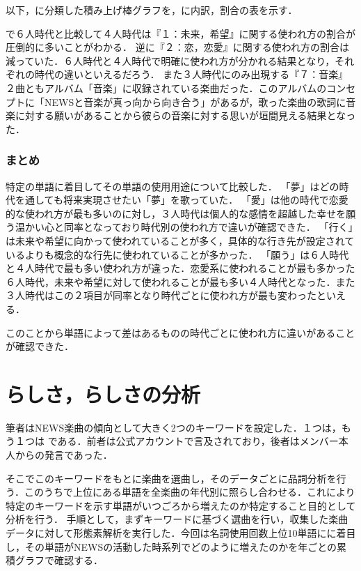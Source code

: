 以下，に分類した積み上げ棒グラフを，\protect{}に内訳，割合の表を示す．

\protect{}で６人時代と比較して４人時代は『１：未来，希望』に関する使われ方の割合が圧倒的に多いことがわかる．
逆に『２：恋，恋愛』に関する使われ方の割合は減っていた．６人時代と４人時代で明確に使われ方が分かれる結果となり，それぞれの時代の違いといえるだろう．
また３人時代にのみ出現する『７：音楽』２曲ともアルバム「音楽\cite{Ongaku}」に収録されている楽曲だった．このアルバムのコンセプトに「NEWSと音楽が真っ向から向き合う」があるが，歌った楽曲の歌詞に音楽に対する願いがあることから彼らの音楽に対する思いが垣間見える結果となった．


\subsubsection{まとめ}
特定の単語に着目してその単語の使用用途について比較した．
「夢」はどの時代を通しても将来実現させたい「夢」を歌っていた．
「愛」は他の時代で恋愛的な使われ方が最も多いのに対し，３人時代は個人的な感情を超越した幸せを願う温かい心と同率となっており時代別の使われ方で違いが確認できた．
「行く」は未来や希望に向かって使われていることが多く，具体的な行き先が設定されているよりも概念的な行先に使われていることが多かった．
「願う」は６人時代と４人時代で最も多い使われ方が違った．恋愛系に使われることが最も多かった６人時代，未来や希望に対して使われることが最も多い４人時代となった．また３人時代はこの２項目が同率となり時代ごとに使われ方が最も変わったといえる．

このことから単語によって差はあるものの時代ごとに使われ方に違いがあることが確認できた．



\section{\senaka らしさ，\emotional らしさの分析}\label{sec:words}

筆者はNEWS楽曲の傾向として大きく2つのキーワードを設定した．１つは\senaka ，もう１つは \emotional である．前者は公式アカウントで言及されており，後者はメンバー本人からの発言であった．

そこでこのキーワードをもとに楽曲を選曲し，そのデータごとに品詞分析を行う．このうちで上位にある単語を全楽曲の年代別に照らし合わせる．これにより特定のキーワードを示す単語がいつごろから増えたのか特定すること目的として分析を行う．
手順として，まずキーワードに基づく選曲を行い，収集した楽曲データに対して形態素解析を実行した．今回は名詞使用回数上位10単語にに着目し，その単語がNEWSの活動した時系列でどのように増えたのかを年ごとの累積グラフで確認する．


